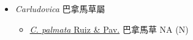 
  \begin{itemize}
 \item[] \textit{Carludovica} 巴拿馬草屬
                                
  \begin{itemize}
        \item[] \href{http://www.theplantlist.org/tpl1.1/search?q=Carludovica+palmata}{\textit{C. palmata} Ruiz \& Pav.}   巴拿馬草   NA (N)
  \end{itemize}
  \end{itemize}
